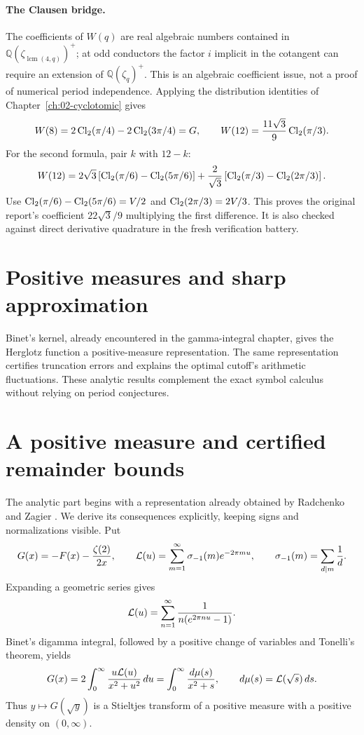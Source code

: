 \paragraph{The Clausen bridge.}
The coefficients of $W(q)$ are real algebraic numbers contained in
$\mathbb Q(\zeta_{\operatorname{lcm}(4,q)})^+$; at odd conductors the factor
$i$ implicit in the cotangent can require an extension of
$\mathbb Q(\zeta_q)^+$. This is an algebraic coefficient issue, not a proof
of numerical period independence. Applying the distribution identities
of Chapter~\ref{ch:02-cyclotomic} gives
\[
W(8)=2\operatorname{Cl}_2(\pi/4)-2\operatorname{Cl}_2(3\pi/4)=G,
\qquad
W(12)=\frac{11\sqrt3}{9}\operatorname{Cl}_2(\pi/3).
\]
For the second formula, pair $k$ with $12-k$:
\[
W(12)=2\sqrt3\left[\operatorname{Cl}_2(\pi/6)-\operatorname{Cl}_2(5\pi/6)\right]
+\frac2{\sqrt3}\left[\operatorname{Cl}_2(\pi/3)-\operatorname{Cl}_2(2\pi/3)\right].
\]
Use $\operatorname{Cl}_2(\pi/6)-\operatorname{Cl}_2(5\pi/6)=V/2$ and
$\operatorname{Cl}_2(2\pi/3)=2V/3$. This proves the original report's coefficient
$22\sqrt3/9$ multiplying the first difference. It is also checked against
direct derivative quadrature in the fresh verification battery.

\section{Positive measures and sharp approximation}
Binet's kernel, already encountered in the gamma-integral chapter, gives
the Herglotz function a positive-measure representation. The same
representation certifies truncation errors and explains the optimal
cutoff's arithmetic fluctuations. These analytic results complement the
exact symbol calculus without relying on period conjectures.

\section{A positive measure and certified remainder bounds}
\label{hstruct:sec:measure}

The analytic part begins with a representation already obtained by
Radchenko and Zagier \cite[\S7.3]{RadchenkoZagier}. We derive its consequences
explicitly, keeping signs and normalizations visible. Put
\begin{equation}\label{hstruct:eq:G}
 G(x)=-F(x)-\frac{\zeta(2)}{2x},\qquad
 \mathcal L(u)=\sum_{m=1}^{\infty}\sigma_{-1}(m)e^{-2\pi m u},
 \qquad \sigma_{-1}(m)=\sum_{d\mid m}\frac1d.
\end{equation}
Expanding a geometric series gives
\[
 \mathcal L(u)=\sum_{n=1}^{\infty}\frac1{n(e^{2\pi n u}-1)}.
\]
Binet's digamma integral, followed by a positive change of variables
and Tonelli's theorem, yields
\begin{equation}\label{hstruct:eq:Stieltjes}
 G(x)=2\int_0^\infty\frac{u\mathcal L(u)}{x^2+u^2}\,du
     =\int_0^\infty\frac{d\mu(s)}{x^2+s},
 \qquad d\mu(s)=\mathcal L(\sqrt{s})\,ds.
\end{equation}
Thus $y\mapsto G(\sqrt y)$ is a Stieltjes transform of a positive
measure with a positive density on $(0,\infty)$.

